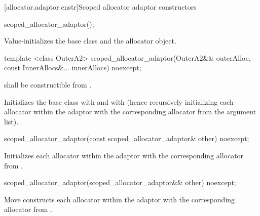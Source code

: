 [allocator.adaptor.cnstr]{Scoped allocator adaptor constructors}

%
\begin{itemdecl}
scoped_allocator_adaptor();
\end{itemdecl}

\begin{itemdescr}
\pnum
\effects Value-initializes the  base class and the  allocator
object.
\end{itemdescr}

%
\begin{itemdecl}
template <class OuterA2>
  scoped_allocator_adaptor(OuterA2&& outerAlloc,
                           const InnerAllocs&... innerAllocs) noexcept;
\end{itemdecl}

\begin{itemdescr}
\pnum
\requires {} shall be constructible from .

\pnum
\effects Initializes the  base class with
 and  with 
(hence recursively initializing each allocator within the adaptor with the corresponding
allocator from the argument list).
\end{itemdescr}

%
\begin{itemdecl}
scoped_allocator_adaptor(const scoped_allocator_adaptor& other) noexcept;
\end{itemdecl}

\begin{itemdescr}
\pnum
\effects Initializes each allocator within the adaptor with the corresponding allocator
from .
\end{itemdescr}

%
\begin{itemdecl}
scoped_allocator_adaptor(scoped_allocator_adaptor&& other) noexcept;
\end{itemdecl}

\begin{itemdescr}
\pnum
\effects Move constructs each allocator within the adaptor with the corresponding allocator
from .
\end{itemdescr}

